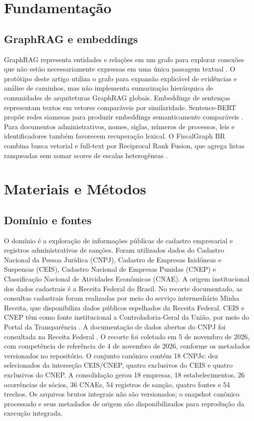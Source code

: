 \documentclass[conference]{IEEEtran}
\begin{document}
\section{Fundamentação}
\subsection{GraphRAG e embeddings}
GraphRAG representa entidades e relações em um grafo para explorar conexões que não estão necessariamente expressas em uma única passagem textual \cite{edge2024}. O protótipo deste artigo utiliza o grafo para expansão explicável de evidências e análise de caminhos, mas não implementa sumarização hierárquica de comunidades de arquiteturas GraphRAG globais.
Embeddings de sentenças representam textos em vetores comparáveis por similaridade. Sentence-BERT propõe redes siamesas para produzir embeddings semanticamente comparáveis \cite{reimers2019}. Para documentos administrativos, nomes, siglas, números de processos, leis e identificadores também favorecem recuperação lexical. O FiscalGraph BR combina busca vetorial e full-text por Reciprocal Rank Fusion, que agrega listas ranqueadas sem somar scores de escalas heterogêneas \cite{cormack2009}.
\section{Materiais e Métodos}
\subsection{Domínio e fontes}
O domínio é a exploração de informações públicas de cadastro empresarial e registros administrativos de sanções. Foram utilizados dados do Cadastro Nacional da Pessoa Jurídica (CNPJ), Cadastro de Empresas Inidôneas e Suspensas (CEIS), Cadastro Nacional de Empresas Punidas (CNEP) e Classificação Nacional de Atividades Econômicas (CNAE).
A origem institucional dos dados cadastrais é a Receita Federal do Brasil. No recorte documentado, as consultas cadastrais foram realizadas por meio do serviço intermediário Minha Receita, que disponibiliza dados públicos espelhados da Receita Federal. CEIS e CNEP têm como fonte institucional a Controladoria-Geral da União, por meio do Portal da Transparência \cite{cgu}. A documentação de dados abertos do CNPJ foi consultada na Receita Federal \cite{rfb}. O recorte foi coletado em 5 de novembro de 2026, com competência de referência de 4 de novembro de 2026, conforme os metadados versionados no repositório.
O conjunto canônico contém 18 CNPJs: dez selecionados da interseção CEIS/CNEP, quatro exclusivos do CEIS e quatro exclusivos do CNEP. A consolidação gerou 18 empresas, 18 estabelecimentos, 26 ocorrências de sócios, 36 CNAEs, 54 registros de sanção, quatro fontes e 54 trechos. Os arquivos brutos integrais não são versionados; o snapshot canônico processado e seus metadados de origem são disponibilizados para reprodução da execução integrada.
\end{document}
